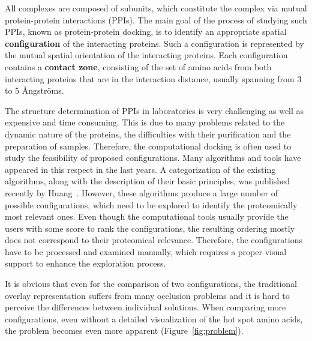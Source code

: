 \documentclass{bmcart}
\begin{document}
All complexes are composed of subunits, which constitute the complex via mutual protein-protein interactions (PPIs).
The main goal of the process of studying such PPIs, known as protein-protein docking, is to identify an appropriate spatial \textbf{configuration} of the interacting proteins.
Such a configuration is represented by the mutual spatial orientation of the interacting proteins.
Each configuration contains a \textbf{contact zone}, consisting of the set of amino acids from both interacting proteins that are in the interaction distance, usually spanning from 3 to 5 \AA ngstr\"{o}ms.

The structure determination of PPIs in laboratories is very challenging as well as expensive and time consuming.
This is due to many problems related to the dynamic nature of the proteins, the difficulties with their purification and the preparation of samples.
Therefore, the computational docking is often used to study the feasibility of proposed configurations.
Many algorithms and tools have appeared in this respect in the last years.
A categorization of the existing algorithms, along with the description of their basic principles, was published recently by Huang~\cite{Huang2014}.
However, these algorithms produce a large number of possible configurations, which need to be explored to identify the proteomically most relevant ones.
Even though the computational tools usually provide the users with some score to rank the configurations, the resulting ordering mostly does not correspond to their proteomical relevance.
Therefore, the configurations have to be processed and examined manually, which requires a proper visual support to enhance the exploration process.

It is obvious that even for the comparison of two configurations, the traditional overlay representation suffers from many occlusion problems and it is hard to perceive the differences between individual solutions.
When comparing more configurations, even without a detailed visualization of the hot spot amino acids, the problem becomes even more apparent (Figure~\ref{fig:problem}).
\end{document}
